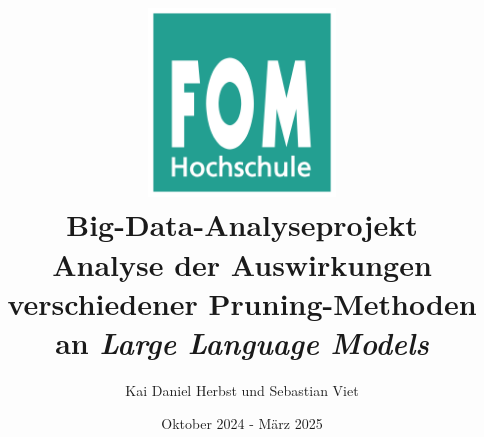 \documentclass[12pt]{article}
\title{
    \includegraphics[width=5cm]{images/logo.png}
    \\
    \vspace{1cm}
    \textbf{Big-Data-Analyseprojekt}\\ \bigskip \large Analyse der Auswirkungen
    verschiedener Pruning-Methoden an \emph{Large Language Models}
}
\author{Kai Daniel Herbst und Sebastian Viet}
\date{Oktober 2024 - März 2025}
\begin{document}
\begin{sloppypar}
	\maketitle
	\thispagestyle{empty}

	\newpage
	\setcounter{page}{1}

	\renewcommand{\contentsname}{Inhaltsverzeichnis}
	\tableofcontents

	\newpage
	\setcounter{page}{1}

    
    
    
    
    
\end{sloppypar}
\end{document}
